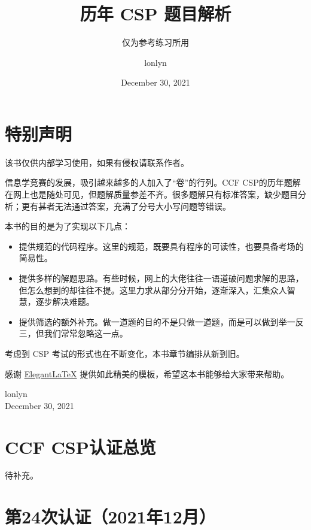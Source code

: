 \documentclass[cn,10pt,math=newtx,citestyle=gb7714-2015,bibstyle=gb7714-2015]{elegantbook}
\title{历年 CSP 题目解析}
\subtitle{仅为参考练习所用}
\author{lonlyn}
\institute{Shanxi University Algorithm Group}
\date{December 30, 2021}
\begin{document}
\maketitle
\frontmatter

\chapter*{特别声明}


该书仅供内部学习使用，如果有侵权请联系作者。

信息学竞赛的发展，吸引越来越多的人加入了“卷”的行列。CCF CSP的历年题解在网上也是随处可见，但题解质量参差不齐。很多题解只有标准答案，缺少题目分析；更有甚者无法通过答案，充满了分号大小写问题等错误。

本书的目的是为了实现以下几点：

\begin{itemize}
    \item 提供规范的代码程序。这里的规范，既要具有程序的可读性，也要具备考场的简易性。
    \item 提供多样的解题思路。有些时候，网上的大佬往往一语道破问题求解的思路，但怎么想到的却往往不提。这里力求从部分分开始，逐渐深入，汇集众人智慧，逐步解决难题。
    \item 提供筛选的额外补充。做一道题的目的不是只做一道题，而是可以做到举一反三，但我们常常忽略这一点。
\end{itemize}

考虑到 CSP 考试的形式也在不断变化，本书章节编排从新到旧。

感谢 \href{https://github.com/ElegantLaTeX/ElegantBook}{Elegant\LaTeX{}} 提供如此精美的模板，希望这本书能够给大家带来帮助。

\vskip 1.5cm

\begin{flushright}
    lonlyn\\
    December 30, 2021
\end{flushright}

\tableofcontents

\mainmatter

\chapter{CCF CSP认证总览}

待补充。


\chapter{第24次认证（2021年12月）}
\end{document}
